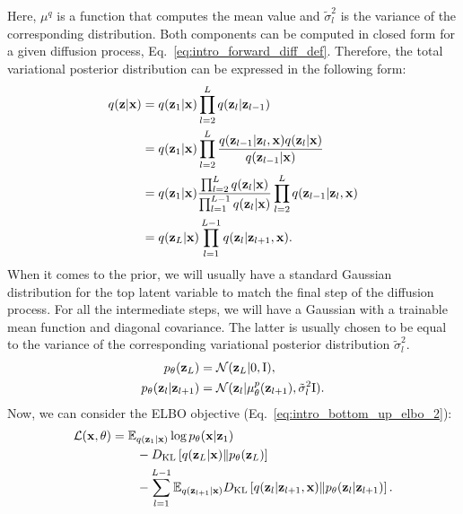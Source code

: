 \newline
Here, $\mu^q$ is a function that computes the mean value and $\tilde{\sigma}^2_l$ is the variance of the corresponding distribution. Both components can be computed in closed form for a given diffusion process, Eq.~\ref{eq:intro_forward_diff_def}. Therefore, the total variational posterior distribution can be expressed in the following form:
\begin{align}
    q({\mathbf{z}}|{\mathbf{x}}) &= q({\mathbf{z}}_1|{\mathbf{x}})\prod_{l=2}^L q({\mathbf{z}}_l|{\mathbf{z}}_{l-1}) \\
    & = q({\mathbf{z}}_1|{\mathbf{x}})\prod_{l=2}^L \frac{q({\mathbf{z}}_{l-1} |{\mathbf{z}}_l, {\mathbf{x}})q({\mathbf{z}}_l|{\mathbf{x}})}{q({\mathbf{z}}_{l-1}|{\mathbf{x}})}\\
    & = q({\mathbf{z}}_1|{\mathbf{x}})  \frac{\prod_{l=2}^L q({\mathbf{z}}_l|{\mathbf{x}})}{\prod_{l=1}^{L-1} q({\mathbf{z}}_{l}|{\mathbf{x}})}\prod_{l=2}^L q({\mathbf{z}}_{l-1} |{\mathbf{z}}_l, {\mathbf{x}})\\
    & = q({\mathbf{z}}_L|{\mathbf{x}})\prod_{l=1}^{L-1} q({\mathbf{z}}_{l} |{\mathbf{z}}_{l+1}, {\mathbf{x}}).
\end{align}
When it comes to the prior, we will usually have a standard Gaussian distribution for the top latent variable to match the final step of the diffusion process. For all the intermediate steps, we will have a Gaussian with a trainable mean function and diagonal covariance. The latter is usually chosen to be equal to the variance of the corresponding variational posterior distribution $\tilde{\sigma}^2_l$. 
\begin{equation}\begin{aligned}
    p_{\theta}({\mathbf{z}}_L) &= \mathcal{N}({\mathbf{z}}_{L} | 0, \text{I}),\\
   p_{\theta}({\mathbf{z}}_l|{\mathbf{z}}_{l+1}) &= \mathcal{N}({\mathbf{z}}_{l} | \mu_{\theta}^p({\mathbf{z}}_{l+1}), \tilde{\sigma}^2_l\text{I}).
   \end{aligned}
\end{equation}
Now, we can consider the ELBO objective (Eq.~\ref{eq:intro_bottom_up_elbo_2}):
\begin{align}
    \mathcal{L}(\rvx, \theta) & =\E_{q(\rvz_{1}|\rvx)}\log p_{\theta}(\rvx|\rvz_{1}) \label{eq:intro_dgm_elbo_1}\\
    &\quad\quad-\KL{ q(\rvz_L|\rvx)}{p_{\theta}(\rvz_L)}\label{eq:intro_dgm_elbo_2}\\
    &\quad\quad- \sum_{l=1}^{L-1} \E_{q(\rvz_{l+1}|\rvx)} \KL{q(\rvz_l|\rvz_{l+1}, \rvx)}{p_{\theta}(\rvz_l|\rvz_{l+1})}. \label{eq:intro_dgm_elbo_3}
\end{align}
